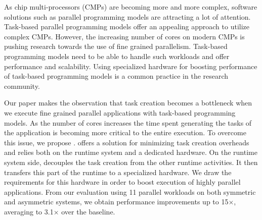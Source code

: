 As chip multi-processors (CMPs) are becoming more and more complex, software solutions such as parallel programming models are attracting a lot of attention.
Task-based parallel programming models offer an appealing approach to utilize complex CMPs.
However, the increasing number of cores on modern CMPs is pushing research towards the use of fine grained parallelism.
Task-based programming models need to be able to handle such workloads and offer performance and scalability.
Using specialized hardware for boosting performance of task-based programming models is a common practice in the research community.

Our paper makes the observation that task creation becomes a bottleneck when we execute fine grained parallel applications with task-based programming models.
As the number of cores increases the time spent generating the tasks of the application is becoming more critical to the entire execution.
To overcome this issue, we propose {\proposal}.
{\proposal} offers a solution for minimizing task creation overheads and relies both on the runtime system and a dedicated hardware.
On the runtime system side, {\proposal} decouples the task creation from the other runtime activities.
It then transfers this part of the runtime to a specialized hardware.
We draw the requirements for this hardware in order to boost execution of highly parallel applications.
From our evaluation using 11 parallel workloads on both symmetric and asymmetric systems, we obtain performance improvements up to 15$\times$, averaging to 3.1$\times$ over the baseline.


